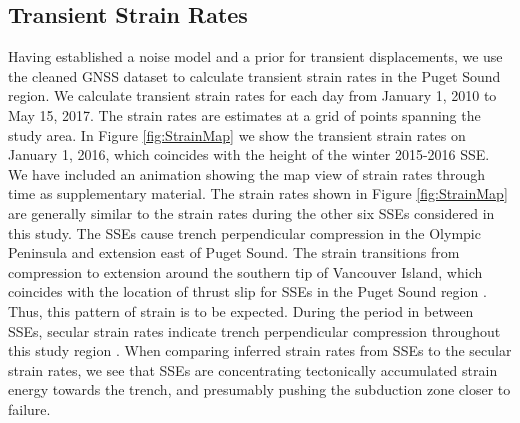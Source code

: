 \documentclass[extra,mreferee]{gji}
\begin{document}
\subsection{Transient Strain Rates}\label{sec:Results} 

Having established a noise model and a prior for transient
displacements, we use the cleaned GNSS dataset to calculate transient
strain rates in the Puget Sound region.  We calculate transient strain
rates for each day from January 1, 2010 to May 15, 2017. The strain
rates are estimates at a grid of points spanning the study area. In
Figure \ref{fig:StrainMap} we show the transient strain rates on
January 1, 2016, which coincides with the height of the winter
2015-2016 SSE. We have included an animation showing the map view of
strain rates through time as supplementary material. The strain rates
shown in Figure \ref{fig:StrainMap} are generally similar to the
strain rates during the other six SSEs considered in this study. The
SSEs cause trench perpendicular compression in the Olympic Peninsula
and extension east of Puget Sound. The strain transitions from
compression to extension around the southern tip of Vancouver Island,
which coincides with the location of thrust slip for SSEs in the Puget
Sound region \citep[e.g.,][]{Dragert2001,Wech2009,Schmidt2010}. Thus,
this pattern of strain is to be expected. During the period in between
SSEs, secular strain rates indicate trench perpendicular compression
throughout this study region \citep{Murray2000, McCaffrey2007,
McCaffrey2013}. When comparing inferred strain rates from SSEs to the
secular strain rates, we see that SSEs are concentrating tectonically
accumulated strain energy towards the trench, and presumably pushing
the subduction zone closer to failure.

\end{document}
